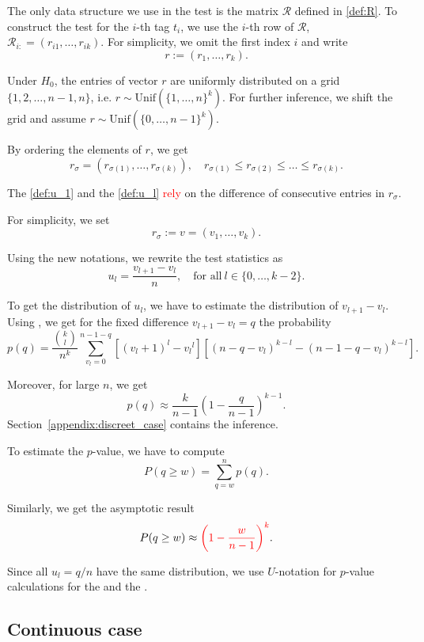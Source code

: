 \documentclass{llncs}
\begin{document}
The only data structure we use in the test is the matrix $\mathcal{R}$ defined in \eqref{def:R}. To construct the test for the $i$-th tag $t_i$, we use the $i$-th row of $\mathcal{R}$, $\mathcal{R}_{i:} = (r_{i1}, \dots, r_{ik})$. For simplicity, we omit the first index $i$ and write
\[
r := (r_{1}, \dots, r_{k}).
\]

Under $H_0$, the entries of vector $r$ are uniformly distributed on a grid $\{1, 2, \dots, n-1, n\}$, i.e. $r\sim \text{Unif}(\{1, \dots, n\}^k)$. For further inference, we shift the grid and assume $r\sim \text{Unif}(\{0, \dots, n-1\}^k)$.

By ordering the elements of $r$, we get
\[
r_{\sigma} = (r_{\sigma(1)}, \dots, r_{\sigma(k)}), 
\quad
r_{\sigma(1)} \leq r_{\sigma(2)} \leq \dots \leq r_{\sigma(k)}.
\]

The  \eqref{def:u_1} and the  \eqref{def:u_l} 
\textcolor{red}{rely} on the difference of consecutive entries in $r_{\sigma}$.

For simplicity, we set
\begin{equation}
\label{def:u}
    r_{\sigma} := v = (v_1, \dots, v_k).
\end{equation}

Using the new notations, we rewrite the test statistics as
\[
u_l = \frac{v_{l+1} - v_{l}}{n}, \quad
\text{for all}~ l\in \{0, \dots, k-2\}.
\]

To get the distribution of $u_l$, we have to estimate the distribution of $v_{l+1}- v_l$. Using \cite{khatri1962distributions}, we get
for the fixed difference $v_{l+1}-v_{l} = q$ the probability  
\[
p(q) = \frac{\binom{k}{l}}{n^k}\sum^{n-1-q}_{v_l = 0} \left[(v_l + 1)^{l} - {v_l}^l \right] \left[ (n-q-v_l)^{k-l} - (n-1-q-v_l)^{k-l}\right].
\]

Moreover, for large $n$, we get
\[
p(q) \approx \frac{k}{n-1}\left(1 - \frac{q}{n-1} \right)^{k-1}.
\]
Section~\ref{appendix:discreet_case} contains the inference.

To estimate the $p$-value, we have to compute
\[
P(q \ge w) = \sum^{n}_{q = w} p(q).
\]

Similarly, we get the asymptotic result
\[
P(q \ge w) \approx \textcolor{red}{\left(1 - \frac{w}{n-1} \right)^{k}}.
\]


Since all $u_l = q/n$ have the same distribution, we use $U$-notation for $p$-value calculations for the  and the .

\subsection{Continuous case}
\end{document}
